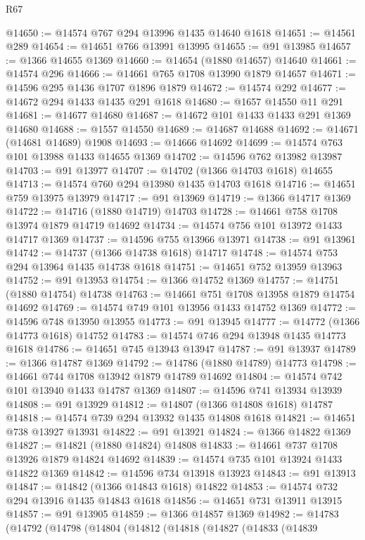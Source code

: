 \begin{lexlean}{R67}
\begin{coremodule}
@14650 := @14574 @767 @294 @13996 @1435 @14640 @1618
@14651 := @14561 @289
@14654 := @14651 @766 @13991 @13995
@14655 := @91 @13985
@14657 := @1366 @14655 @1369
@14660 := @14654 (@1880 @14657) @14640
@14661 := @14574 @296
@14666 := @14661 @765 @1708 @13990 @1879 @14657
@14671 := @14596 @295 @1436 @1707 @1896 @1879
@14672 := @14574 @292
@14677 := @14672 @294 @1433 @1435 @291 @1618
@14680 := @1657 @14550 @11 @291
@14681 := @14677 @14680
@14687 := @14672 @101 @1433 @1433 @291 @1369 @14680
@14688 := @1557 @14550
@14689 := @14687 @14688
@14692 := @14671 (@14681 @14689) @1908
@14693 := @14666 @14692
@14699 := @14574 @763 @101 @13988 @1433 @14655 @1369
@14702 := @14596 @762 @13982 @13987
@14703 := @91 @13977
@14707 := @14702 (@1366 @14703 @1618) @14655
@14713 := @14574 @760 @294 @13980 @1435 @14703 @1618
@14716 := @14651 @759 @13975 @13979
@14717 := @91 @13969
@14719 := @1366 @14717 @1369
@14722 := @14716 (@1880 @14719) @14703
@14728 := @14661 @758 @1708 @13974 @1879 @14719 @14692
@14734 := @14574 @756 @101 @13972 @1433 @14717 @1369
@14737 := @14596 @755 @13966 @13971
@14738 := @91 @13961
@14742 := @14737 (@1366 @14738 @1618) @14717
@14748 := @14574 @753 @294 @13964 @1435 @14738 @1618
@14751 := @14651 @752 @13959 @13963
@14752 := @91 @13953
@14754 := @1366 @14752 @1369
@14757 := @14751 (@1880 @14754) @14738
@14763 := @14661 @751 @1708 @13958 @1879 @14754 @14692
@14769 := @14574 @749 @101 @13956 @1433 @14752 @1369
@14772 := @14596 @748 @13950 @13955
@14773 := @91 @13945
@14777 := @14772 (@1366 @14773 @1618) @14752
@14783 := @14574 @746 @294 @13948 @1435 @14773 @1618
@14786 := @14651 @745 @13943 @13947
@14787 := @91 @13937
@14789 := @1366 @14787 @1369
@14792 := @14786 (@1880 @14789) @14773
@14798 := @14661 @744 @1708 @13942 @1879 @14789 @14692
@14804 := @14574 @742 @101 @13940 @1433 @14787 @1369
@14807 := @14596 @741 @13934 @13939
@14808 := @91 @13929
@14812 := @14807 (@1366 @14808 @1618) @14787
@14818 := @14574 @739 @294 @13932 @1435 @14808 @1618
@14821 := @14651 @738 @13927 @13931
@14822 := @91 @13921
@14824 := @1366 @14822 @1369
@14827 := @14821 (@1880 @14824) @14808
@14833 := @14661 @737 @1708 @13926 @1879 @14824 @14692
@14839 := @14574 @735 @101 @13924 @1433 @14822 @1369
@14842 := @14596 @734 @13918 @13923
@14843 := @91 @13913
@14847 := @14842 (@1366 @14843 @1618) @14822
@14853 := @14574 @732 @294 @13916 @1435 @14843 @1618
@14856 := @14651 @731 @13911 @13915
@14857 := @91 @13905
@14859 := @1366 @14857 @1369
@14982 := @14783
    (@14792
      (@14798
        (@14804
          (@14812
            (@14818
              (@14827
                (@14833
                  (@14839

\end{coremodule}
\end{lexlean}
